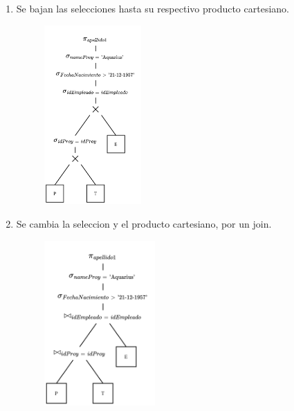 \documentclass{templateNote}
\begin{document}
\begin{enumerate}
\begin{enumerate}
\begin{enumerate}
            \item Se bajan las selecciones hasta su respectivo producto cartesiano.
            \begin{figure}[H]
                \centering
                \includegraphics[width=0.35\textwidth]{img/E1-Paso3.png}
            \end{figure}

            \newpage
            \item Se cambia la seleccion y el producto cartesiano, por un join.
            \begin{figure}[H]
                \centering
                \includegraphics[width=0.4\textwidth]{img/E1-Paso4.png}
            \end{figure}


\end{enumerate}
\end{enumerate}
\end{enumerate}
\end{document}
